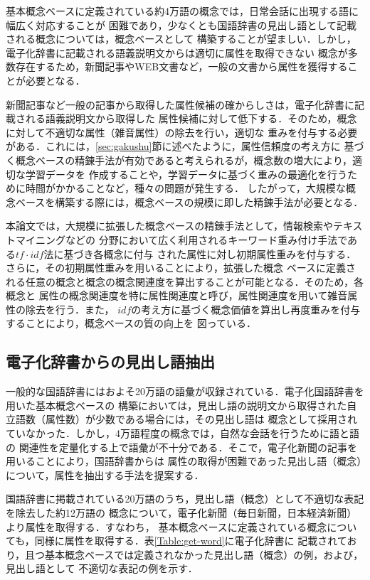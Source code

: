 \documentclass[japanese]{jnlp_1.3e}
\begin{document}
基本概念ベースに定義されている約4万語の概念では，日常会話に出現する語に幅広く対応することが
困難であり，少なくとも国語辞書の見出し語として記載される概念については，概念ベースとして
構築することが望ましい．しかし，電子化辞書に記載される語義説明文からは適切に属性を取得できない
概念が多数存在するため，新聞記事やWEB文書など，一般の文書から属性を獲得することが必要となる．

新聞記事など一般の記事から取得した属性候補の確からしさは，電子化辞書に記載される語義説明文から取得した
属性候補に対して低下する．そのため，概念に対して不適切な属性（雑音属性）の除去を行い，適切な
重みを付与する必要がある．これには，\ref{sec:gakushu}節に述べたように，属性信頼度の考え方に
基づく概念ベースの精錬手法が有効であると考えられるが，概念数の増大により，適切な学習データを
作成することや，学習データに基づく重みの最適化を行うために時間がかかることなど，種々の問題が発生する．
したがって，大規模な概念ベースを構築する際には，概念ベースの規模に即した精錬手法が必要となる．

本論文では，大規模に拡張した概念ベースの精錬手法として，情報検索やテキストマイニングなどの
分野において広く利用されるキーワード重み付け手法である$\mathit{tf}\cdot\mathit{idf}$法\cite{tokunaga1999}に基づき各概念に付与
された属性に対し初期属性重みを付与する．さらに，その初期属性重みを用いることにより，拡張した概念
ベースに定義される任意の概念と概念の概念関連度を算出することが可能となる．そのため，各概念と
属性の概念関連度を特に属性関連度と呼び，属性関連度を用いて雑音属性の除去を行う．また，
$\mathit{idf}$の考え方に基づく概念価値を算出し再度重みを付与することにより，概念ベースの質の向上を
図っている．



\subsection{電子化辞書からの見出し語抽出}

一般的な国語辞書にはおよそ20万語の語彙が収録されている．電子化国語辞書を用いた基本概念ベースの
構築においては，見出し語の説明文から取得された自立語数（属性数）が少数である場合には，その見出し語は
概念として採用されていなかった．しかし，4万語程度の概念では，自然な会話を行うために語と語の
関連性を定量化する上で語彙が不十分である．そこで，電子化新聞の記事を用いることにより，国語辞書からは
属性の取得が困難であった見出し語（概念）について，属性を抽出する手法を提案する．

国語辞書に掲載されている20万語のうち，見出し語（概念）として不適切な表記を除去した約12万語の
概念について，電子化新聞（毎日新聞，日本経済新聞）より属性を取得する．すなわち，
基本概念ベースに定義されている概念についても，同様に属性を取得する．表\ref{Table:get-word}に電子化辞書に
記載されており，且つ基本概念ベースでは定義されなかった見出し語（概念）の例，および，見出し語として
不適切な表記の例を示す．
\end{document}
